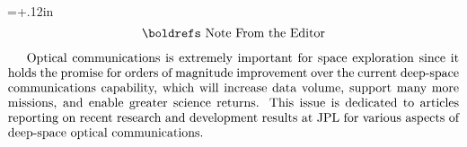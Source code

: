 


\hoffset=+.12in
\baselineskip=12pt
\nopagenumbers
$$\vbox{\hsize=360pt
\centerline{\boldrefs Note~From~the~Editor}\vskip8pt
Optical communications is extremely important for space exploration since it holds the
promise for orders of magnitude improvement over the current deep-space communications
capability, which will increase data volume, support many more missions, and enable
greater science returns. This issue is dedicated to articles reporting on recent research
and development results at JPL for various aspects of deep-space optical communications.
}$$


\bye



